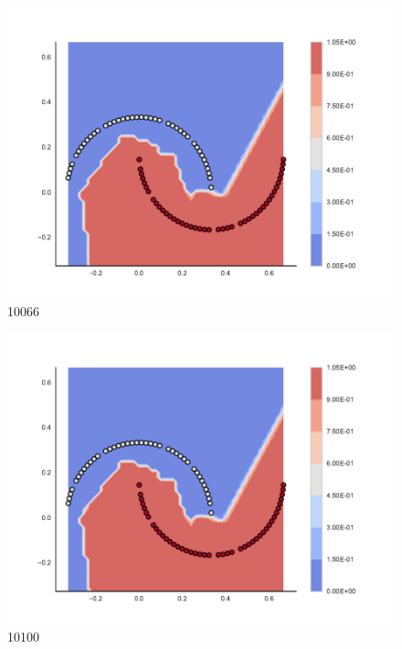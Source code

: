 \begin{subfigure}[b]{0.09\textwidth}
    \includegraphics[clip, trim=2.35cm 1.75cm 4.5cm 0cm,width=\textwidth]{img/convergence/10066.pdf}
    \caption{10066}
    \label{fig:convergence_10066}
\end{subfigure}
%
\begin{subfigure}[b]{0.09\textwidth}
    \includegraphics[clip, trim=2.35cm 1.75cm 4.5cm 0cm,width=\textwidth]{img/convergence/10100.pdf}
    \caption{10100}
    \label{fig:convergence_10100}
\end{subfigure}
%
